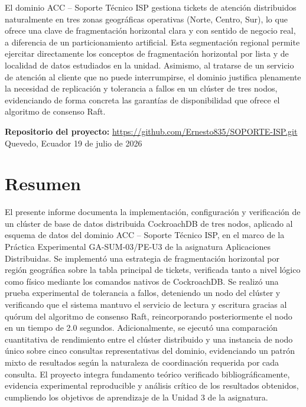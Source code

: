 \documentclass[12pt, a4paper]{article}
\begin{document}
\begin{titlepage}
\begin{minipage}{0.85\linewidth}
\justifying\footnotesize
El dominio ACC -- Soporte Técnico ISP gestiona tickets de atención distribuidos naturalmente en tres zonas geográficas operativas (Norte, Centro, Sur), lo que ofrece una clave de fragmentación horizontal clara y con sentido de negocio real, a diferencia de un particionamiento artificial. Esta segmentación regional permite ejercitar directamente los conceptos de fragmentación horizontal por lista y de localidad de datos estudiados en la unidad. Asimismo, al tratarse de un servicio de atención al cliente que no puede interrumpirse, el dominio justifica plenamente la necesidad de replicación y tolerancia a fallos en un clúster de tres nodos, evidenciando de forma concreta las garantías de disponibilidad que ofrece el algoritmo de consenso Raft.
\end{minipage}
\vspace{0.4cm}
{\small
  \textbf{Repositorio del proyecto:} \url{https://github.com/Ernesto835/SOPORTE-ISP.git}
}
\vfill
{\small Quevedo, Ecuador \textperiodcentered{} 19 de julio de 2026}
\end{titlepage}

\tableofcontents
\newpage

\section*{Resumen}

El presente informe documenta la implementación, configuración y verificación de un clúster de base de datos distribuida CockroachDB de tres nodos, aplicado al esquema de datos del dominio ACC -- Soporte Técnico ISP, en el marco de la Práctica Experimental GA-SUM-03/PE-U3 de la asignatura Aplicaciones Distribuidas. Se implementó una estrategia de fragmentación horizontal por región geográfica sobre la tabla principal de tickets, verificada tanto a nivel lógico como físico mediante los comandos nativos de CockroachDB. Se realizó una prueba experimental de tolerancia a fallos, deteniendo un nodo del clúster y verificando que el sistema mantuvo el servicio de lectura y escritura gracias al quórum del algoritmo de consenso Raft, reincorporando posteriormente el nodo en un tiempo de 2.0 segundos. Adicionalmente, se ejecutó una comparación cuantitativa de rendimiento entre el clúster distribuido y una instancia de nodo único sobre cinco consultas representativas del dominio, evidenciando un patrón mixto de resultados según la naturaleza de coordinación requerida por cada consulta. El proyecto integra fundamento teórico verificado bibliográficamente, evidencia experimental reproducible y análisis crítico de los resultados obtenidos, cumpliendo los objetivos de aprendizaje de la Unidad 3 de la asignatura.
\end{document}
